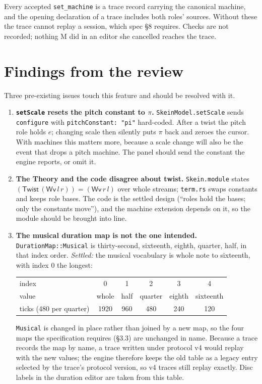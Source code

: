 \documentclass[11pt,a4paper]{article}
\theoremstyle{definition}
\theoremstyle{plain}
\theoremstyle{remark}
\begin{document}
Every accepted \texttt{set\_machine} is a trace record carrying the canonical machine, and the
opening declaration of a trace includes both roles' sources. Without these the trace cannot replay a
session, which spec \S8 requires. Checks are not recorded; nothing M did in an editor she cancelled
reaches the trace.

\section{Findings from the review}
\label{sec:findings}

Three pre-existing issues touch this feature and should be resolved with it.

\begin{enumerate}[leftmargin=*,itemsep=3pt]
\item \textbf{\texttt{setScale} resets the pitch constant to $\pi$.} \texttt{SkeinModel.setScale}
  sends \texttt{configure} with \texttt{pitchConstant: "pi"} hard-coded. After a twist the pitch
  role holds $e$; changing scale then silently puts $\pi$ back and zeroes the cursor. With machines
  this matters more, because a scale change will also be the event that drops a pitch machine. The
  panel should send the constant the engine reports, or omit it.
\item \textbf{The Theory and the code disagree about twist.} \texttt{Skein.module} states
  $(\mathsf{Twist}\,(\mathsf{Wv}\,l\,r))=(\mathsf{Wv}\,r\,l)$ over whole streams; \texttt{term.rs}
  swaps constants and keeps role bases. The code is the settled design (``roles hold the bases; only
  the constants move''), and the machine extension depends on it, so the module should be brought
  into line.
\item \textbf{The musical duration map is not the one intended.} \texttt{DurationMap::Musical} is
  thirty-second, sixteenth, eighth, quarter, half, in that index order. \emph{Settled:} the musical
  vocabulary is whole note to sixteenth, with index 0 the longest:
  \begin{center}
  \begin{tabular}{lccccc}
  \toprule
  index & 0 & 1 & 2 & 3 & 4 \\
  value & whole & half & quarter & eighth & sixteenth \\
  ticks (480 per quarter) & 1920 & 960 & 480 & 240 & 120 \\
  \bottomrule
  \end{tabular}
  \end{center}
  \texttt{Musical} is changed in place rather than joined by a new map, so the four maps the
  specification requires (\S3.3) are unchanged in name. Because a trace records the map by name, a
  trace written under protocol v4 would replay with the new values; the engine therefore keeps the
  old table as a legacy entry selected by the trace's protocol version, so v4 traces still replay
  exactly. Disc labels in the duration editor are taken from this table.


\end{enumerate}
\end{document}
